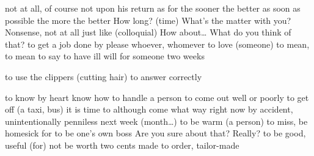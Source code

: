 {not at all, of course not}
{upon his return}
{as for}
{the sooner the better}
{as soon as possible}
{the more the better}
{How long? (time)}
{What’s the matter with you?}
{Nonsense, not at all}
{just like (colloquial)}
{How about…}
{What do you think of that?}
{to get a job done by}
{please}
{whoever, whomever}
{to love (someone)}
{to mean, to mean to say}
{to have ill will for someone}
{two weeks}

{to use the clippers (cutting hair)}
{to answer correctly}

{to know by heart}
{know how to handle a person}
{to come out well or poorly}
{to get off (a taxi, bus)}
{it is time to}
{although}
{come what way}
{right now}
{by accident, unintentionally}
{penniless}
{next week (month…)}
{to be warm (a person)}
{to miss, be homesick for}
{to be one’s own boss}
{Are you sure about that?}
{Really?}
{to be good, useful (for)}
{not be worth two cents}
{made to order, tailor-made}

